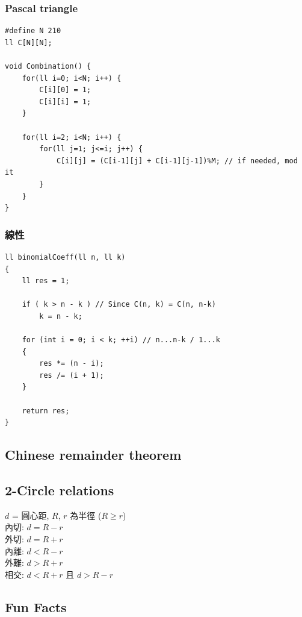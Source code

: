 \documentclass[10pt,oneside]{article}
\begin{document}
\begin{landscape}
\begin{multicols}{2}
\subsubsection{Pascal triangle}

\begin{verbatim}
#define N 210
ll C[N][N];

void Combination() {
    for(ll i=0; i<N; i++) {
        C[i][0] = 1;
        C[i][i] = 1;
    }

    for(ll i=2; i<N; i++) {
        for(ll j=1; j<=i; j++) {
            C[i][j] = (C[i-1][j] + C[i-1][j-1])%M; // if needed, mod it
        }
    }
}
\end{verbatim}

\subsubsection{線性}

\begin{verbatim}
ll binomialCoeff(ll n, ll k)
{
    ll res = 1;
 
    if ( k > n - k ) // Since C(n, k) = C(n, n-k)
        k = n - k;
 
    for (int i = 0; i < k; ++i) // n...n-k / 1...k
    {
        res *= (n - i);
        res /= (i + 1);
    }
 
    return res;
}
\end{verbatim}

\subsection{Chinese remainder theorem}

\subsection{2-Circle relations}

$d$ = 圓心距, $R$, $r$ 為半徑 ($R \geq r$)\\
內切: $d = R - r$\\
外切: $d = R + r$\\
內離: $d < R - r$\\
外離: $d > R + r$\\
相交: $d < R + r$ 且 $d > R - r$

\subsection{Fun Facts}


\end{multicols}
\end{landscape}
\end{document}
